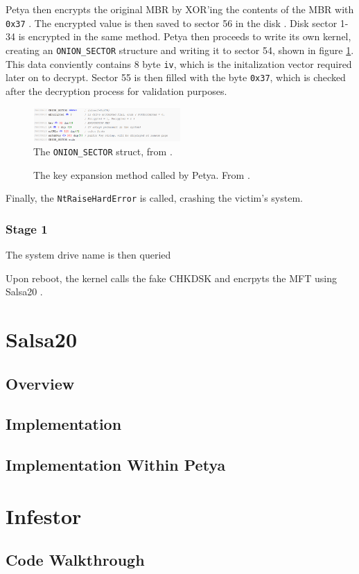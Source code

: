 \documentclass[twocolumn]{article}
\newcommand{\code}[1]{\texttt{#1}}
\begin{document}
Petya then encrypts the original MBR by XOR'ing the contents of the MBR with \code{0x37} \cite{breakingPetya}. The encrypted value is then saved to sector 56 in the disk \cite{xrayPetya}. Disk sector 1-34 is encrypted in the same method. Petya then proceeds to write its own kernel, creating an \code{ONION\_SECTOR} structure and writing it to sector 54, shown in figure \ref{fig:onion_sector}. This data conviently contains 8 byte \code{iv}, which is the initalization vector required later on to decrypt. Sector 55 is then filled with the byte \code{0x37}, which is checked after the decryption process for validation purposes.

\begin{figure}
	\includegraphics[width = 0.5\textwidth]{onion_sector.png}
	\caption{The \code{ONION\_SECTOR} struct, from \cite{decryptPetya}. }
	\label{fig:onion_sector}	
\end{figure}

\begin{figure}
	
	\caption{The key expansion method called by Petya. From \cite{decryptPetya}.}
	\label{ls:key_expand}
\end{figure}

Finally, the \code{NtRaiseHardError} is called, crashing the victim's system. 

\subsubsection{Stage 1}
The system drive name is then queried 



Upon reboot, the kernel calls the fake CHKDSK and encrpyts the MFT using Salsa20 \cite{salsa20Spec}. 
\section{Salsa20}
\subsection{Overview}
\subsection{Implementation}
\subsection{Implementation Within Petya}

\section{Infestor}
\subsection{Code Walkthrough}

 
\end{document}
